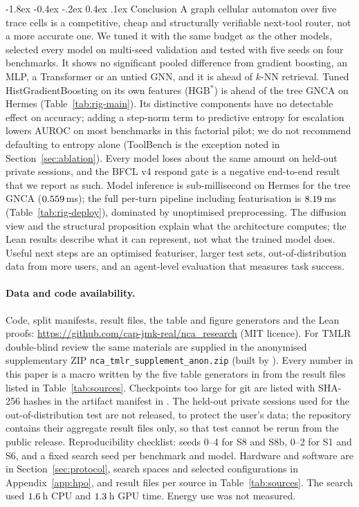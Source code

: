 \documentclass[10pt,twocolumn,letterpaper]{article}
\makeatletter
\renewcommand\section{\@startsection {section}{1}{\z@}%
  {-1.8ex \@plus -0.4ex \@minus -.2ex}%
  {0.4ex \@plus.1ex}%
  {\normalfont\normalsize\bfseries}}
\makeatother
\begin{document}
\section{Conclusion}\label{sec:conclusion}
A graph cellular automaton over five trace cells is a competitive, cheap and structurally verifiable next-tool router, not a more accurate one. We tuned it with the same budget as the other models, selected every model on multi-seed validation and tested with five seeds on four benchmarks. It shows no significant pooled difference from gradient boosting, an MLP, a Transformer or an untied GNN, and it is ahead of $k$-NN retrieval. Tuned HistGradientBoosting on its own features (HGB$^\ast$) is ahead of the tree GNCA on Hermes (Table~\ref{tab:rig-main}). Its distinctive components have no detectable effect on accuracy; adding a step-norm term to predictive entropy for escalation lowers AUROC on most benchmarks in this factorial pilot; we do not recommend defaulting to entropy alone (ToolBench is the exception noted in Section~\ref{sec:ablation}). Every model loses about the same amount on held-out private sessions, and the BFCL v4 respond gate is a negative end-to-end result that we report as such. Model inference is sub-millisecond on Hermes for the tree GNCA ($0.559$\,ms); the full per-turn pipeline including featurisation is $8.19$\,ms (Table~\ref{tab:rig-deploy}), dominated by unoptimised preprocessing. The diffusion view and the structural proposition explain what the architecture computes; the Lean results describe what it can represent, not what the trained model does. Useful next steps are an optimised featuriser, larger test sets, out-of-distribution data from more users, and an agent-level evaluation that measures task success.

\paragraph{Data and code availability.}\sloppy Code, split manifests, result files, the table and figure generators and the Lean proofs: \url{https://github.com/cap-jmk-real/nca_research} (MIT licence). For TMLR double-blind review the same materials are supplied in the anonymised supplementary ZIP \texttt{nca\_tmlr\_supplement\_anon.zip} (built by ). Every number in this paper is a macro written by the five table generators in  from the result files listed in Table~\ref{tab:sources}. Checkpoints too large for git are listed with SHA-256 hashes in the artifact manifest in . The held-out private sessions used for the out-of-distribution test are not released, to protect the user's data; the repository contains their aggregate result files only, so that test cannot be rerun from the public release. Reproducibility checklist: seeds 0--4 for S8 and S8b, 0--2 for S1 and S6, and a fixed search seed per benchmark and model. Hardware and software are in Section~\ref{sec:protocol}, search spaces and selected configurations in Appendix~\ref{app:hpo}, and result files per source in Table~\ref{tab:sources}. The search used $1.6$\,h CPU and $1.3$\,h GPU time. Energy use was not measured.
\end{document}
